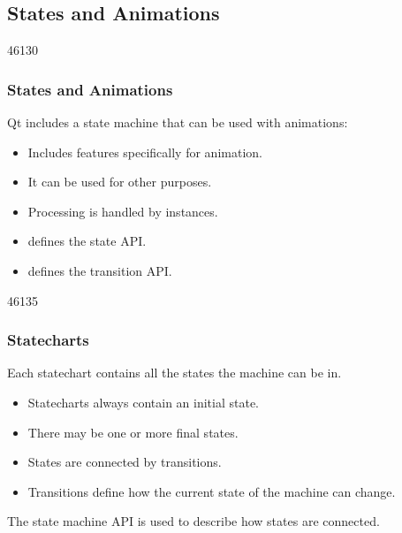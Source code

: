 %
%
%
%

\subsection{States and Animations}

\begin{slide}{46130}\frametitle{States and Animations}
\vspace*{1.5em}
Qt includes a state machine that can be used with animations:
\begin{itemize}
\item Includes features specifically for animation.
\item It can be used for other purposes.
\item Processing is handled by  instances.
\item {} defines the state API.
\item {} defines the transition API.
\end{itemize}
\end{slide}

\begin{slide}{46135}\frametitle{Statecharts}
\vspace*{1.5em}
Each statechart contains all the states the machine can be in.

\begin{itemize}
\item Statecharts always contain an initial state.
\item There may be one or more final states.
\item States are connected by transitions.
\item Transitions define how the current state of the machine can change.
\end{itemize}

The state machine API is used to describe how states are connected.
\end{slide}

